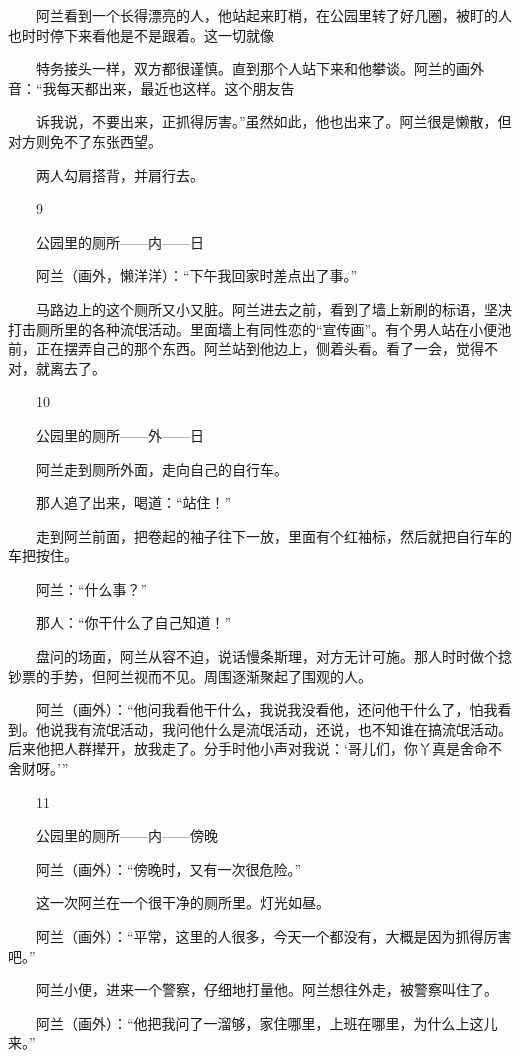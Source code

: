 　　阿兰看到一个长得漂亮的人，他站起来盯梢，在公园里转了好几圈，被盯的人也时时停下来看他是不是跟着。这一切就像 

　　特务接头一样，双方都很谨慎。直到那个人站下来和他攀谈。阿兰的画外音：“我每天都出来，最近也这样。这个朋友告 

　　诉我说，不要出来，正抓得厉害。”虽然如此，他也出来了。阿兰很是懒散，但对方则免不了东张西望。 

　　两人勾肩搭背，并肩行去。 

　　9 

　　公园里的厕所——内——日 

　　阿兰（画外，懒洋洋）：“下午我回家时差点出了事。” 

　　马路边上的这个厕所又小又脏。阿兰进去之前，看到了墙上新刷的标语，坚决打击厕所里的各种流氓活动。里面墙上有同性恋的“宣传画”。有个男人站在小便池前，正在摆弄自己的那个东西。阿兰站到他边上，侧着头看。看了一会，觉得不对，就离去了。 

　　10 

　　公园里的厕所——外——日 

　　阿兰走到厕所外面，走向自己的自行车。 

　　那人追了出来，喝道：“站住！” 

　　走到阿兰前面，把卷起的袖子往下一放，里面有个红袖标，然后就把自行车的车把按住。 

　　阿兰：“什么事？” 

　　那人：“你干什么了自己知道！” 

　　盘问的场面，阿兰从容不迫，说话慢条斯理，对方无计可施。那人时时做个捻钞票的手势，但阿兰视而不见。周围逐渐聚起了围观的人。 

　　阿兰（画外）：“他问我看他干什么，我说我没看他，还问他干什么了，怕我看到。他说我有流氓活动，我问他什么是流氓活动，还说，也不知谁在搞流氓活动。后来他把人群撵开，放我走了。分手时他小声对我说：‘哥儿们，你丫真是舍命不舍财呀。’” 

　　11 

　　公园里的厕所——内——傍晚 

　　阿兰（画外）：“傍晚时，又有一次很危险。” 

　　这一次阿兰在一个很干净的厕所里。灯光如昼。 

　　阿兰（画外）：“平常，这里的人很多，今天一个都没有，大概是因为抓得厉害吧。” 

　　阿兰小便，进来一个警察，仔细地打量他。阿兰想往外走，被警察叫住了。 

　　阿兰（画外）：“他把我问了一溜够，家住哪里，上班在哪里，为什么上这儿来。” 

